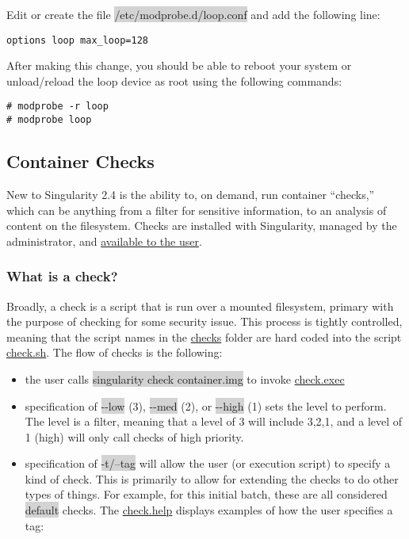 \documentclass[a4paper]{article}
\begin{document}
Edit or create the file  \colorbox{lightgray}{/etc/modprobe.d/loop.conf} and add the following line:

\begin{lstlisting}[frame=single]
options loop max_loop=128
\end{lstlisting}

After making this change, you should be able to reboot your system or unload/reload the loop device as root using the following commands:

\begin{lstlisting}[frame=single]
# modprobe -r loop
# modprobe loop
\end{lstlisting}

\subsection{Container Checks}

New to Singularity 2.4 is the ability to, on demand, run container “checks,” which can be anything from a filter for sensitive information, to an analysis of content on the filesystem. Checks are installed with Singularity, managed by the administrator, and \href{http://singularity.lbl.gov/docs-user-checks}{available to the user}.

\subsubsection{What is a check?}
Broadly, a check is a script that is run over a mounted filesystem, primary with the purpose of checking for some security issue. This process is tightly controlled, meaning that the script names in the \href{https://github.com/sylabs/singularity/tree/development/libexec/helpers/checks}{checks} folder are hard coded into the script \href{https://github.com/sylabs/singularity/blob/development/libexec/helpers/check.sh}{check.sh}. The flow of checks is the following:
\\[0.1in]

\begin{itemize}
\item the user calls \colorbox{lightgray}{singularity check container.img} to invoke \href{https://github.com/sylabs/singularity/blob/development/libexec/cli/check.exec}{check.exec}
\item specification of  \colorbox{lightgray}{-{}-low} (3),  \colorbox{lightgray}{-{}-med} (2), or  \colorbox{lightgray}{-{}-high} (1) sets the level to perform. The level is a filter, meaning that a level of 3 will include 3,2,1, and a level of 1 (high) will only call checks of high priority.
\item specification of  \colorbox{lightgray}{-t/--tag} will allow the user (or execution script) to specify a kind of check. This is primarily to allow for extending the checks to do other types of things. For example, for this initial batch, these are all considered  \colorbox{lightgray}{default} checks. The \href{https://github.com/sylabs/singularity/blob/development/libexec/cli/check.help}{check.help} displays examples of how the user specifies a tag:
\end{itemize}
\end{document}
